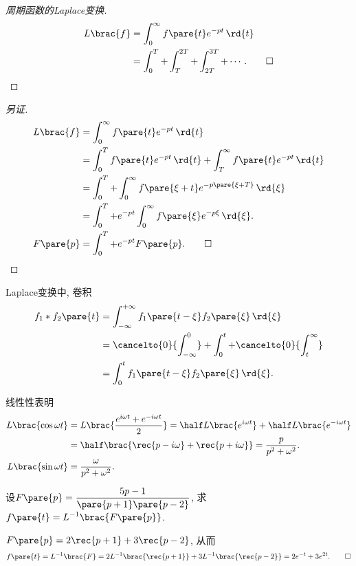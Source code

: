 \documentclass[../ComplexVariable.tex]{subfiles}
\begin{document}
\begin{proof}[周期函数的Laplace变换]
    \begin{align*}
        L\brac{f} &= \int_0^\infty f\pare{t} e^{-pt}\,\rd{t} \\
        &= \int_0^T + \int_T^{2T} + \int_{2T}^{3T} + \cdots. \qedhere
    \end{align*}
\end{proof}
\begin{proof}[另证]
    \begin{align*}
        L\brac{f} &= \int_0^\infty f\pare{t} e^{-pt}\,\rd{t} \\ &= \int_0^T f\pare{t} e^{-pt}\,\rd{t} + \int_T^\infty f\pare{t}e^{-pt}\,\rd{t}
         \\ &= \int_0^T + \int_0^\infty f\pare{\xi + t} e^{-p\pare{\xi + T}}\,\rd{\xi} \\
        &= \int_0^T + e^{-pt}\int_0^\infty f\pare{\xi} e^{-p\xi}\,\rd{\xi}. \\
        F\pare{p} &= \int_0^T + e^{-pt}F\pare{p}. \qedhere
    \end{align*}
\end{proof}
Laplace变换中, 卷积
\begin{align*}
    f_1*f_2\pare{t} &= \int_{-\infty}^{+\infty} f_1\pare{t-\xi} f_2\pare{\xi}\,\rd{\xi} \\
    &= \cancelto{0}{\int_{-\infty}^{0}} + \int_0^t + \cancelto{0}{\int_t^\infty} \\
    &= \int_0^t f_1\pare{t-\xi} f_2\pare{\xi}\,\rd{\xi}.
\end{align*}
\begin{sample}
    \begin{ex}
        线性性表明
        \begin{align*}
            L\brac{\cos\omega t} &= L\brac{\frac{e^{i\omega t} + e^{-i\omega t}}{2}} = \half L\brac{e^{i\omega t}} + \half L\brac{e^{-i\omega t}} \\ &= \half \brac{\rec{p- i\omega} + \rec{p+i\omega}} = \frac{p}{p^2+\omega^2}. \\
            L\brac{\sin\omega t} &= \frac{\omega}{p^2+\omega^2}.
        \end{align*}
    \end{ex}
\end{sample}
\begin{sample}
    \begin{ex}
        设$\displaystyle F\pare{p} = \frac{5p-1}{\pare{p+1}\pare{p-2}}$, 求$\displaystyle f\pare{t} = L^{-1}\brac{F\pare{p}}$.
    \end{ex}
    \begin{solution}
        $\displaystyle F\pare{p} = 2\rec{p+1} + 3\rec{p-2}$, 从而
        \[ f\pare{t} = L^{-1}\brac{F} = 2L^{-1}\brac{\rec{p+1}} + 3L^{-1}\brac{\rec{p-2}} = 2e^{-t} + 3e^{2t}. \qedhere \]
    \end{solution}
\end{sample}
\end{document}
